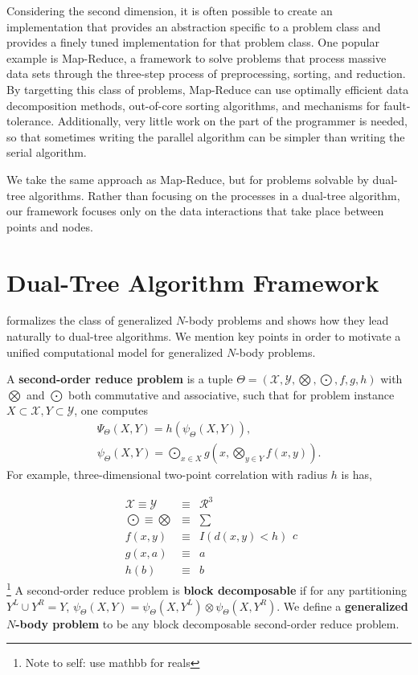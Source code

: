 \documentclass[times, leqno,twocolumn]{article}
\newcommand{\authornote}[1]{\footnote{Note to self: #1}}
\newcommand{\authorsnote}[1]{\authornote{#1}}
\newcommand{\union}{\cup}
\newcommand{\Gnp}{\Psi_{\Theta}}
\newcommand{\gnp}{\psi_{\Theta}}
\newcommand{\defterm}[1]{{\bf #1}}
\newcommand{\kdleft}[1]{#1^{\!L}}
\newcommand{\kdright}[1]{#1^{\!R}}
\begin{document}
Considering the second dimension, it is often possible to create an implementation that provides an abstraction specific to a problem class and provides a finely tuned implementation for that problem class.
One popular example is Map-Reduce, a framework to solve problems that process massive data sets through the three-step process of preprocessing, sorting, and reduction.
By targetting this class of problems, Map-Reduce can use optimally efficient data decomposition methods, out-of-core sorting algorithms, and mechanisms for fault-tolerance.
Additionally, very little work on the part of the programmer is needed, so that sometimes writing the parallel algorithm can be simpler than writing the serial algorithm.

We take the same approach as Map-Reduce, but for problems solvable by dual-tree algorithms.
Rather than focusing on the processes in a dual-tree algorithm, our framework focuses only on the data interactions that take place between points and nodes.

\section{Dual-Tree Algorithm Framework}

\cite{ryan_nips} formalizes the class of generalized $N$-body problems and shows how they lead naturally to dual-tree algorithms.
We mention key points in order to motivate a unified computational model for generalized $N$-body problems.

A \defterm{second-order reduce problem} is a tuple $\Theta = (\mathcal{X}, \mathcal{Y}, \bigotimes, \bigodot, f, g, h)$ with $\bigotimes$ and $\bigodot$ both commutative and associative, such that for problem instance $X \subset {\mathcal{X}}, Y \subset {\mathcal{Y}}$, one computes
\[\begin{array}{l}
  \displaystyle \Gnp(X, Y) = h(\gnp(X, Y)),
  \\
  \displaystyle \gnp(X, Y) = \bigodot_{x \in X} g\!\left(x, \bigotimes_{y \in Y} f(x, y) \right).
\end{array}\]
\noindent For example, three-dimensional two-point correlation with radius $h$ is has,

\[\begin{array}{rcl}
  \mathcal{X} \equiv \mathcal{Y} &\equiv& \mathcal{R}^3
  \\
  \bigodot \equiv \bigotimes &\equiv& \sum
  \\
  f(x,y) &\equiv& I(d(x,y) < h)
  \\
  g(x, a) &\equiv& a
  \\
  h(b) &\equiv& b
\end{array}{c}\]
\noindent \authorsnote{use mathbb for reals}
A second-order reduce problem is \defterm{block decomposable} if for any partitioning $\kdleft{Y} \union \kdright{Y} = Y$, $\gnp(X,Y) = \gnp(X,\kdleft{Y}) \otimes \gnp(X,\kdright{Y})$.
We define a \defterm{generalized $N$-body problem} to be any block decomposable second-order reduce problem.
\end{document}
